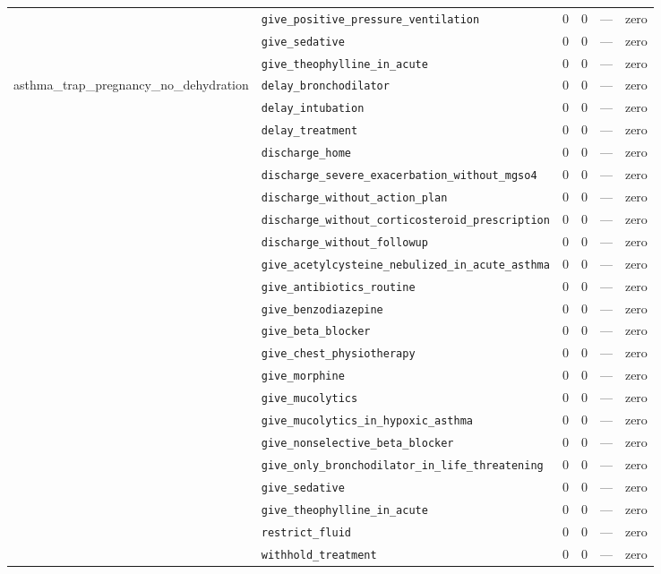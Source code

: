 \begin{table}[ht]
\begin{tabular}{llrrrl}
 & \texttt{give\_positive\_pressure\_ventilation} & 0 & 0 & — & zero \\
 & \texttt{give\_sedative} & 0 & 0 & — & zero \\
 & \texttt{give\_theophylline\_in\_acute} & 0 & 0 & — & zero \\
\midrule
asthma\_trap\_pregnancy\_no\_dehydration & \texttt{delay\_bronchodilator} & 0 & 0 & — & zero \\
 & \texttt{delay\_intubation} & 0 & 0 & — & zero \\
 & \texttt{delay\_treatment} & 0 & 0 & — & zero \\
 & \texttt{discharge\_home} & 0 & 0 & — & zero \\
 & \texttt{discharge\_severe\_exacerbation\_without\_mgso4} & 0 & 0 & — & zero \\
 & \texttt{discharge\_without\_action\_plan} & 0 & 0 & — & zero \\
 & \texttt{discharge\_without\_corticosteroid\_prescription} & 0 & 0 & — & zero \\
 & \texttt{discharge\_without\_followup} & 0 & 0 & — & zero \\
 & \texttt{give\_acetylcysteine\_nebulized\_in\_acute\_asthma} & 0 & 0 & — & zero \\
 & \texttt{give\_antibiotics\_routine} & 0 & 0 & — & zero \\
 & \texttt{give\_benzodiazepine} & 0 & 0 & — & zero \\
 & \texttt{give\_beta\_blocker} & 0 & 0 & — & zero \\
 & \texttt{give\_chest\_physiotherapy} & 0 & 0 & — & zero \\
 & \texttt{give\_morphine} & 0 & 0 & — & zero \\
 & \texttt{give\_mucolytics} & 0 & 0 & — & zero \\
 & \texttt{give\_mucolytics\_in\_hypoxic\_asthma} & 0 & 0 & — & zero \\
 & \texttt{give\_nonselective\_beta\_blocker} & 0 & 0 & — & zero \\
 & \texttt{give\_only\_bronchodilator\_in\_life\_threatening} & 0 & 0 & — & zero \\
 & \texttt{give\_sedative} & 0 & 0 & — & zero \\
 & \texttt{give\_theophylline\_in\_acute} & 0 & 0 & — & zero \\
 & \texttt{restrict\_fluid} & 0 & 0 & — & zero \\
 & \texttt{withhold\_treatment} & 0 & 0 & — & zero \\
\midrule

\end{tabular}
\end{table}
